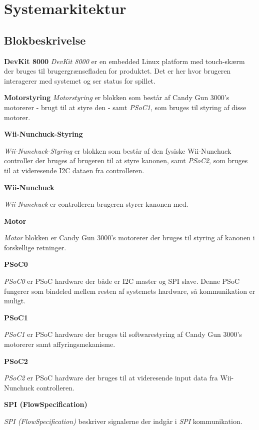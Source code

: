 \chapter{Systemarkitektur}

\section{Blokbeskrivelse}

\textbf{DevKit 8000}
\newline
\textit{DevKit 8000} er en embedded Linux platform med touch-skærm der bruges til brugergrænsefladen for produktet. Det er her hvor brugeren interagerer med systemet og ser status for spillet.

\textbf{Motorstyring}
\newline
\textit{Motorstyring} er blokken som består af Candy Gun 3000's motorerer - brugt til at styre den - samt \textit{PSoC1}, som bruges til styring af disse motorer.

\textbf{Wii-Nunchuck-Styring}

\textit{Wii-Nunchuck-Styring} er blokken som består af den fysiske Wii-Nunchuck controller der bruges af brugeren til at styre kanonen, samt \textit{PSoC2}, som bruges til at videresende I2C dataen fra controlleren.

\textbf{Wii-Nunchuck}

\textit{Wii-Nunchuck} er controlleren brugeren styrer kanonen med.

\textbf{Motor}

\textit{Motor} blokken er Candy Gun 3000's motorerer der bruges til styring af kanonen i forskellige retninger.

\textbf{PSoC0}

\textit{PSoC0} er PSoC hardware der både er I2C master og SPI slave. Denne PSoC fungerer som bindeled mellem resten af systemets hardware, så kommunikation er muligt.

\textbf{PSoC1}

\textit{PSoC1} er PSoC hardware der bruges til softwarestyring af Candy Gun 3000's motorerer samt affyringsmekanisme.

\textbf{PSoC2}

\textit{PSoC2} er PSoC hardware der bruges til at videresende input data fra Wii-Nunchuck controlleren.	

\textbf{SPI (FlowSpecification)}

\textit{SPI (FlowSpecification)} beskriver signalerne der indgår i \textit{SPI} kommunikation.

